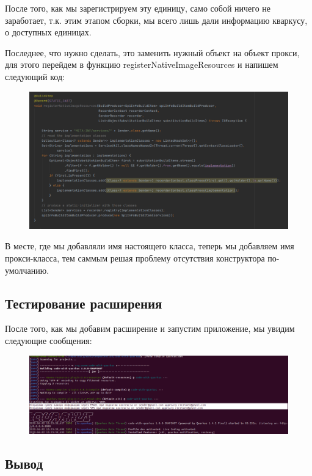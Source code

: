 \documentclass[russian,11pt]{article}
\begin{document}
После того, как мы зарегистрируем эту единицу, само собой ничего не заработает, т.к. этим этапом сборки, мы всего лишь дали информацию кваркусу, о доступных единицах.

Последнее, что нужно сделать, это заменить нужный объект на объект прокси, для этого перейдем в функцию registerNativeImageResources и напишем следующий код: 

\begin{figure}[H]
	\centering
	\includegraphics[width=\textwidth]{25}
\end{figure}

В месте, где мы добавляли имя настоящего класса, теперь мы добавляем имя прокси-класса, тем саммым решая проблему отсутствия конструктора по-умолчанию.

\newpage
\subsection{Тестирование расширения}

После того, как мы добавим расширение и запустим приложение, мы увидим следующие сообщения:

\begin{figure}[H]
	\centering
	\includegraphics[width=\textwidth]{26}
\end{figure}

\subsection{Вывод}
\end{document}
